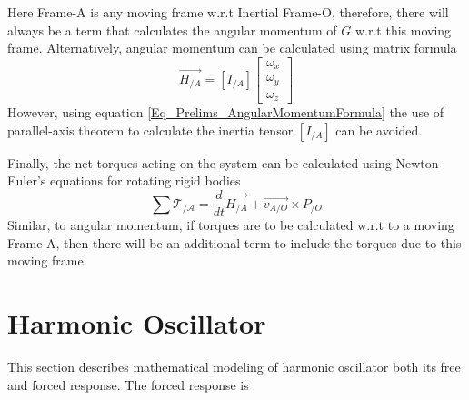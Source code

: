 Here Frame-A is any moving frame w.r.t Inertial Frame-O, therefore, there will always be a term that calculates the angular momentum of $G$ w.r.t this moving frame. Alternatively, angular momentum can be calculated using matrix formula
\begin{equation} \label{Eq_Prelims_AngularMometumMatrixForm}
	\vec{H_{/A}} = [I_{/A}] \begin{bmatrix}
	\omega_{x} \\ \omega_{y} \\ \omega_{z}
	\end{bmatrix}
\end{equation}
However, using equation \eqref{Eq_Prelims_AngularMomentumFormula} the use of parallel-axis theorem to calculate the inertia tensor $[I_{/A}]$ can be avoided.

Finally, the net torques acting on the system can be calculated using Newton-Euler's equations for rotating rigid bodies
\begin{equation}
	\sum \mathcal{T_{/A}} = \frac{d}{dt}\vec{H_{/A}} + \vec{v_{A/O}} \times P_{/O}
\end{equation}
Similar, to angular momentum, if torques are to be calculated w.r.t to a moving Frame-A, then there will be an additional term to include the torques due to this moving frame.


\section{Harmonic Oscillator}

This section describes mathematical modeling of harmonic oscillator both its free and forced response. The forced response is 